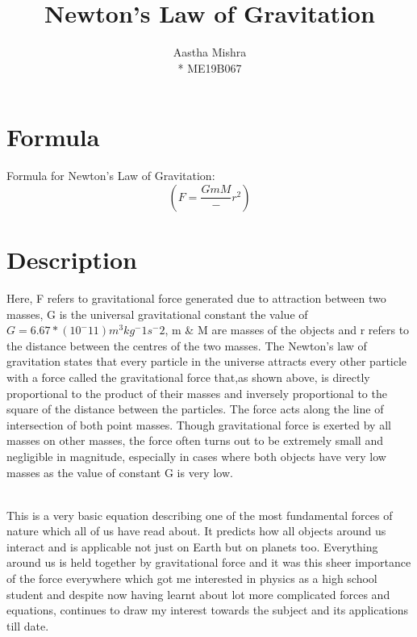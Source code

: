 \documentclass{article}
\title{Newton's Law of Gravitation}
\author{Aastha Mishra \\* ME19B067}
\begin{document}
\section{Formula}
Formula for Newton's Law of Gravitation: 
$$(F=\frac{GmM}-{r^2})$$
\section{Description}
Here, F refers to gravitational force generated due to attraction between two masses, G is the universal gravitational constant the value of $G=6.67*(10^-11)m^3kg^-1s^-2$, m & M are masses of the objects and r refers to the distance between the centres of the two masses. The Newton's law of gravitation states that every particle in the universe attracts every other particle with a force called the gravitational force that,as shown above, is directly proportional to the product of their masses and inversely proportional to the square of the distance between the particles. The force acts along the line of intersection of both point masses. Though gravitational force is exerted by all masses on other masses, the force often turns out to be extremely small and negligible in magnitude, especially in cases where both objects have very low masses as the value of constant G is very low.

\\ This is a very basic equation describing one of the most fundamental forces of nature which all of us have read about. It predicts how all objects around us interact and is applicable not just on Earth but on planets too. Everything around us is held together by gravitational force and it was this sheer importance of the force everywhere which got me interested in physics as a high school student and despite now having learnt about lot more complicated forces and equations, continues to draw my interest towards the subject and its applications till date.
\end{document}
